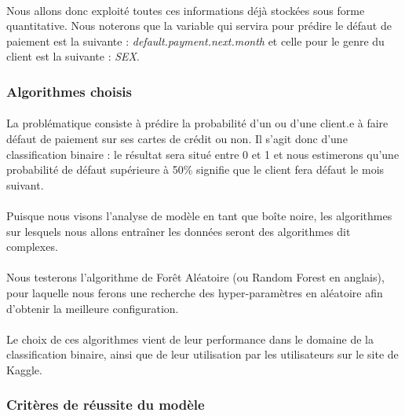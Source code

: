 \documentclass[10pt, french, a4paper]{report}
\begin{document}
\paragraph{}
Nous allons donc exploité toutes ces informations déjà stockées sous forme quantitative. Nous noterons que la variable qui servira pour prédire le défaut de paiement est la suivante : \textit{default.payment.next.month} et celle pour le genre du client est la suivante : \textit{SEX}.

\subsubsection{Algorithmes choisis}

\paragraph{}
La problématique consiste à prédire la probabilité d'un ou d'une client.e à faire défaut de paiement sur ses cartes de crédit ou non. Il s'agit donc d'une classification binaire : le résultat sera situé entre 0 et 1 et nous estimerons qu'une probabilité de défaut supérieure à 50\% signifie que le client fera défaut le mois suivant.

\paragraph{}
Puisque nous visons l'analyse de modèle en tant que boîte noire, les algorithmes sur lesquels nous allons entraîner les données seront des algorithmes dit complexes.

\paragraph{}
Nous testerons l'algorithme de Forêt Aléatoire (ou Random Forest en anglais), pour laquelle nous ferons une recherche des hyper-paramètres en aléatoire afin d'obtenir la meilleure configuration.

\paragraph{}
Le choix de ces algorithmes vient de leur performance dans le domaine de la classification binaire, ainsi que de leur utilisation par les utilisateurs sur le site de Kaggle. 

\subsubsection{Critères de réussite du modèle}
\end{document}
